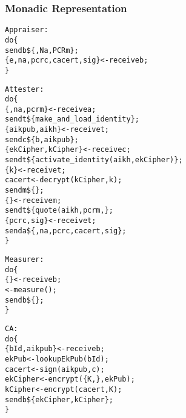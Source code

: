 \documentclass[10pt]{article}
\begin{document}
\newpage

\subsubsection*{Monadic Representation}

\def \appm {a}
\def \attm {b}
\def \cam {c}
\def \meam {m}
\def \tpm {t}

\begin{alltt}
  Appraiser:
  do \{     
       send \attm \$ \{ \evd, Na, PCRm \} ;    % 
       \{ e, na, pcrc, cacert, sig \}  <- receive \attm;
  \}
\end{alltt}

\begin{alltt}
  Attester:
  do \{     
       \{ \evd, na, pcrm \}  <- receive \appm;
       send \tpm \$ \{ make\_and\_load\_identity \};
       \{ aikpub, aikh \} <- receive \tpm;
       send \cam \$ \{ \attm, aikpub \};
       \{ ekCipher, kCipher \} <- receive \cam;
       send \tpm \$ \{ activate_identity(aikh, ekCipher) \};
       \{ k \} <- receive \tpm;
       cacert <- decrypt(kCipher, k);
       send \meam \$ \{ \evd \};
       \{ \eve \} <- receive \meam;
       send \tpm \$ \{ quote(aikh, pcrm,  \};
       \{ pcrc, sig \} <- receive \tpm;
       send \appm \$ \{ \eve, na, pcrc, cacert, sig \};
  \}
\end{alltt}

\begin{alltt}
  Measurer:
  do \{     
       \{ \evd \}  <- receive \attm;
       \eve <- measure(\evd);
       send \attm \$ \{ \eve \};
  \}
\end{alltt}

\begin{alltt}
  CA:
  do \{     
       \{ bId, aikpub \}  <- receive \attm;
       ekPub <- lookupEkPub(bId);
       cacert <- sign(aikpub, c);
       ekCipher <- encrypt( \{ K,  \}, ekPub );
       kCipher <- encrypt( cacert, K);
       send \attm \$ \{ ekCipher, kCipher \};
  \}
\end{alltt}


\end{document}
